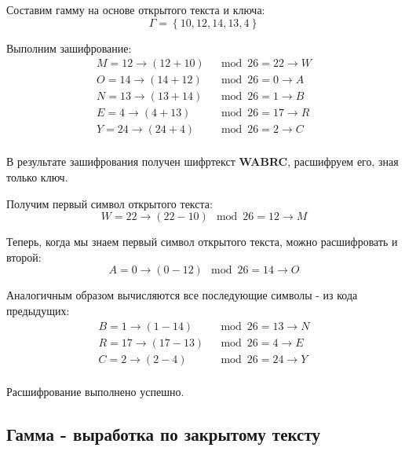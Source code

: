 \documentclass[a4paper]{article}
\begin{document}
  Составим гамму на основе открытого текста и ключа:
  \begin{equation}
    \Gamma = \left\{ 10, 12, 14, 13, 4\right\}
  \end{equation}

  Выполним зашифрование:
  \begin{equation}
    \begin{aligned}
      M = 12 \rightarrow (12 + 10) &\mod 26 = 22 \rightarrow W \\ 
      O = 14 \rightarrow (14 + 12) &\mod 26 = 0 \rightarrow A \\ 
      N = 13 \rightarrow (13 + 14) &\mod 26 = 1 \rightarrow B \\ 
      E = 4 \rightarrow (4 + 13) &\mod 26 = 17 \rightarrow R \\ 
      Y = 24 \rightarrow (24 + 4) &\mod 26 = 2 \rightarrow C \\ 
    \end{aligned}
  \end{equation}

  В результате зашифрования получен шифртекст \textbf{WABRC}, расшифруем его, зная только ключ.

  Получим первый символ открытого текста:
  \begin{equation}
    W = 22 \rightarrow (22 - 10) \mod 26 = 12 \rightarrow M
  \end{equation}

  Теперь, когда мы знаем первый символ открытого текста, можно расшифровать и второй:
  \begin{equation}
    A = 0 \rightarrow (0 - 12) \mod 26 = 14 \rightarrow O
  \end{equation}

  Аналогичным образом вычисляются все последующие символы - из кода предыдущих:
  \begin{equation}
    \begin{aligned}
      B = 1 \rightarrow (1 - 14) &\mod 26 = 13 \rightarrow N \\ 
      R = 17 \rightarrow (17 - 13) &\mod 26 = 4 \rightarrow E \\ 
      C = 2 \rightarrow (2 - 4) &\mod 26 = 24 \rightarrow Y \\ 
    \end{aligned}
  \end{equation}

  Расшифрование выполнено успешно.

  \subsection{Гамма - выработка по закрытому тексту}
\end{document}
